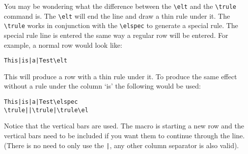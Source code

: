 \documentclass{article}
\begin{document}
\bigskip

You may be wondering what the difference between the \verb|\elt| and the \verb|\trule| 
command is.  The \verb|\elt| will end the line and draw a thin rule under it.  The 
\verb|\trule| works in conjunction with the \verb|\elspec| to generate a special rule.  
The special rule line is entered the same way a regular row will be entered.
For example, a normal row would look like:

\begin{verbatim}
This|is|a|Test\elt
\end{verbatim}

This will produce a row with a thin rule under it.  To produce the 
same effect without a rule under the column `is' the following would be used:

\begin{verbatim}
This|is|a|Test\elspec
\trule||\trule|\trule\el
\end{verbatim}

Notice that the vertical bars are used.  The macro is starting a new 
row and the vertical bars need to be included if you want them to continue 
through the line.  (There is no need to only use the \verb!|!, any other column 
separator is also valid).
\end{document}
